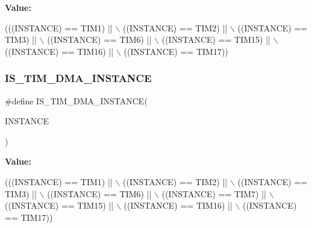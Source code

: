 {\bfseries Value\+:}
\begin{DoxyCode}
(((INSTANCE) == TIM1)    || \(\backslash\)
   ((INSTANCE) == TIM2)    || \(\backslash\)
   ((INSTANCE) == TIM3)    || \(\backslash\)
   ((INSTANCE) == TIM6)    || \(\backslash\)
   ((INSTANCE) == TIM15)   || \(\backslash\)
   ((INSTANCE) == TIM16)   || \(\backslash\)
   ((INSTANCE) == TIM17))
\end{DoxyCode}
\mbox{\label{group___exported__macro_gad51d77b3bcc12a3a5c308d727b561371}} 
\subsubsection{\texorpdfstring{I\+S\+\_\+\+T\+I\+M\+\_\+\+D\+M\+A\+\_\+\+I\+N\+S\+T\+A\+N\+CE}{IS\_TIM\_DMA\_INSTANCE}\hspace{0.1cm}{\footnotesize\ttfamily [10/16]}}
{\footnotesize\ttfamily \#define I\+S\+\_\+\+T\+I\+M\+\_\+\+D\+M\+A\+\_\+\+I\+N\+S\+T\+A\+N\+CE(\begin{DoxyParamCaption}\item[{}]{I\+N\+S\+T\+A\+N\+CE }\end{DoxyParamCaption})}

{\bfseries Value\+:}
\begin{DoxyCode}
(((INSTANCE) == TIM1)    || \(\backslash\)
   ((INSTANCE) == TIM2)    || \(\backslash\)
   ((INSTANCE) == TIM3)    || \(\backslash\)
   ((INSTANCE) == TIM6)    || \(\backslash\)
   ((INSTANCE) == TIM7)    || \(\backslash\)
   ((INSTANCE) == TIM15)   || \(\backslash\)
   ((INSTANCE) == TIM16)   || \(\backslash\)
   ((INSTANCE) == TIM17))
\end{DoxyCode}
\mbox{\label{group___exported__macro_gad51d77b3bcc12a3a5c308d727b561371}} 
